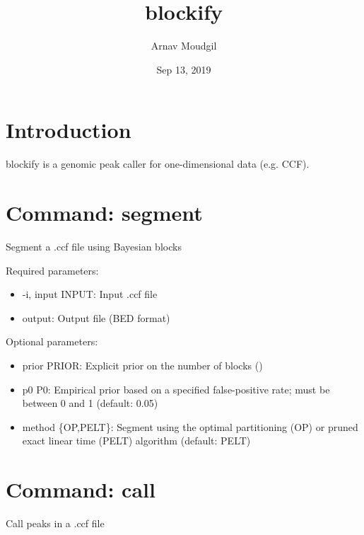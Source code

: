 \documentclass[letterpaper,10pt,english]{sphinxmanual}
\title{blockify}
\date{Sep 13, 2019}
\author{Arnav Moudgil}
\begin{document}
\pagestyle{empty}
\sphinxmaketitle
\pagestyle{plain}
\sphinxtableofcontents
\pagestyle{normal}
\label{\detokenize{index::doc}}



\chapter{Introduction}
\label{\detokenize{pages/intro:introduction}}\label{\detokenize{pages/intro::doc}}
blockify is a genomic peak caller for one-dimensional data (e.g. CCF).


\chapter{Command: segment}
\label{\detokenize{pages/segment:command-segment}}\label{\detokenize{pages/segment::doc}}
Segment a .ccf file using Bayesian blocks

Required parameters:
\begin{itemize}
\item {} 
-i, \textendash{}input INPUT: Input .ccf file

\item {} 
output: Output file (BED format)

\end{itemize}

Optional parameters:
\begin{itemize}
\item {} 
\textendash{}prior PRIOR: Explicit prior on the number of blocks ()

\item {} 
\textendash{}p0 P0: Empirical prior based on a specified false-positive rate; must be between 0 and 1 (default: 0.05)

\item {} 
\textendash{}method \{OP,PELT\}: Segment using the optimal partitioning (OP) or pruned exact linear time (PELT) algorithm (default: PELT)

\end{itemize}


\chapter{Command: call}
\label{\detokenize{pages/call:command-call}}\label{\detokenize{pages/call::doc}}
Call peaks in a .ccf file
\end{document}
